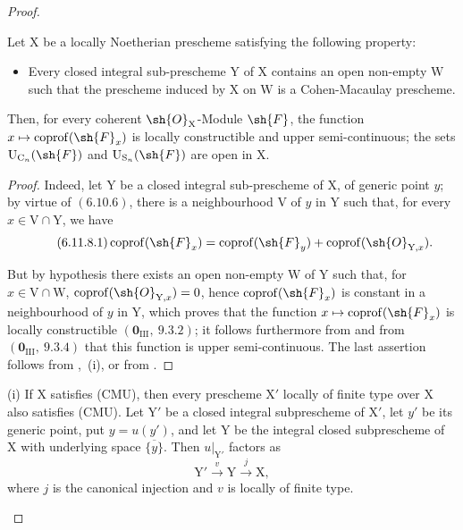 \begin{proof}

\begin{proposition}[6.11.8]
\label{IV.6.11.8}
Let $\mathrm{X}$ be a locally Noetherian prescheme satisfying the following property:
\begin{itemize}
  \item[\textnormal{(CMU)}] Every closed integral sub-prescheme $\mathrm{Y}$ of $\mathrm{X}$ contains an open non-empty $\mathrm{W}$ such that the prescheme induced by $\mathrm{X}$ on $\mathrm{W}$
is a Cohen-Macaulay prescheme.
\end{itemize}
Then, for every coherent $\sh{O}_\mathrm{X}$-Module $\sh{F}$, the function $x\mapsto\operatorname{coprof}(\sh{F}_x)$ is locally constructible and upper
semi-continuous; the sets $\mathrm{U}_{\mathrm{C}_n}(\sh{F})$ and $\mathrm{U}_{\mathrm{S}_n}(\sh{F})$ are open in $\mathrm{X}$.
\end{proposition}

\begin{proof}
Indeed, let $\mathrm{Y}$ be a closed integral sub-prescheme of $\mathrm{X}$, of generic point $y$; by virtue of $(6.10.6)$, there is a
neighbourhood $\mathrm{V}$ of $y$ in $\mathrm{Y}$ such that, for every $x\in\mathrm{V}\cap\mathrm{Y}$, we have
\begin{equation}
\tag{6.11.8.1}
\label{IV.6.11.8.1}
  \operatorname{coprof}(\sh{F}_x)=\operatorname{coprof}(\sh{F}_y)+\operatorname{coprof}(\sh{O}_{\mathrm{Y},x}).
\end{equation}

But by hypothesis there exists an open non-empty $\mathrm{W}$ of $\mathrm{Y}$ such that, for $x\in\mathrm{V}\cap\mathrm{W}$, $\operatorname{coprof}(\sh{O}_{\mathrm{Y},x})=0$,
hence $\operatorname{coprof}(\sh{F}_x)$ is constant in a neighbourhood of $y$ in $\mathrm{Y}$, which proves that the function
$x\mapsto\operatorname{coprof}(\sh{F}_x)$ is
locally constructible $(\mathbf{0}_{\mathrm{III}},~9.3.2)$; it follows furthermore from  and from $(\mathbf{0}_{\mathrm{III}},~9.3.4)$ that this function
is upper semi-continuous. The last assertion follows from ,~(i), or from .
\end{proof}

\begin{remarks}[6.11.9]
\label{IV.6.11.9}
(i) If $\mathrm{X}$ satisfies (CMU), then every prescheme $\mathrm{X}'$ locally of finite type over $\mathrm{X}$ also satisfies (CMU). Let $\mathrm{Y}'$ be a closed integral subprescheme of $\mathrm{X}'$, let $y'$ be its generic point, put $y=u(y')$, and let $\mathrm{Y}$ be the integral closed subprescheme of $\mathrm{X}$ with underlying space $\overline{\{y\}}$. Then $u|_{\mathrm{Y}'}$ factors as
\[
  \mathrm{Y}'\xrightarrow{v}\mathrm{Y}\xrightarrow{j}\mathrm{X},
\]
where $j$ is the canonical injection and $v$ is locally of finite type.


\end{remarks}
\end{proof}
